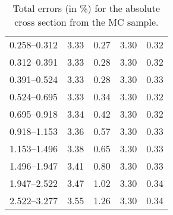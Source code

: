 \begin{table}
\begin{center}
\begin{tabular}{@{}l l l l l@{}}
            0.258--0.312 & 3.33 & 0.27 & 3.30 & 0.32  \\
            0.312--0.391 & 3.33 & 0.28 & 3.30 & 0.32  \\
            0.391--0.524 & 3.33 & 0.28 & 3.30 & 0.33  \\
            0.524--0.695 & 3.33 & 0.34 & 3.30 & 0.32  \\
            0.695--0.918 & 3.34 & 0.42 & 3.30 & 0.32  \\
            0.918--1.153 & 3.36 & 0.57 & 3.30 & 0.33  \\
            1.153--1.496 & 3.38 & 0.65 & 3.30 & 0.33  \\
            1.496--1.947 & 3.41 & 0.80 & 3.30 & 0.33  \\
            1.947--2.522 & 3.47 & 1.02 & 3.30 & 0.34  \\
            2.522--3.277 & 3.55 & 1.26 & 3.30 & 0.34  \\
            \bottomrule
        \end{tabular}
    \end{center}
    \caption{
        Total errors (in \%) for the absolute cross section from the \MADGRAPH
        MC sample.
    }
    \label{tab:madgraph_uncert_abs}
\end{table}
